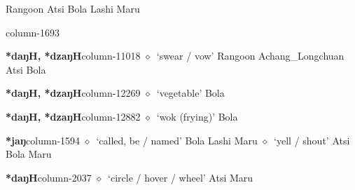          Rangoon 
\hspace{1ex}
         Atsi 
\hspace{1ex}
         Bola 
\hspace{1ex}
         Lashi 
\hspace{1ex}
         Maru 
  \item {\footnotesize \textbf{}}{\tiny column-1693}
  \item {\footnotesize \textbf{*daŋH, *dzaŋH}}{\tiny column-11018}
         $\diamond$~`swear / vow'
         Rangoon 
\hspace{1ex}
         Achang\_Longchuan 
\hspace{1ex}
         Atsi 
\hspace{1ex}
         Bola 
  \item {\footnotesize \textbf{*daŋH, *dzaŋH}}{\tiny column-12269}
         $\diamond$~`vegetable'
         Bola 
  \item {\footnotesize \textbf{*daŋH, *dzaŋH}}{\tiny column-12882}
         $\diamond$~`wok (frying)'
         Bola 
  \item {\footnotesize \textbf{*jaŋ}}{\tiny column-1594}
         $\diamond$~`called, be / named'
         Bola 
\hspace{1ex}
         Lashi 
\hspace{1ex}
         Maru 
\hspace{1ex}
         $\diamond$~`yell / shout'
         Atsi 
\hspace{1ex}
         Bola 
\hspace{1ex}
         Maru 
  \item {\footnotesize \textbf{*daŋH}}{\tiny column-2037}
         $\diamond$~`circle / hover / wheel'
         Atsi 
\hspace{1ex}
         Maru 
\hspace{1ex}
